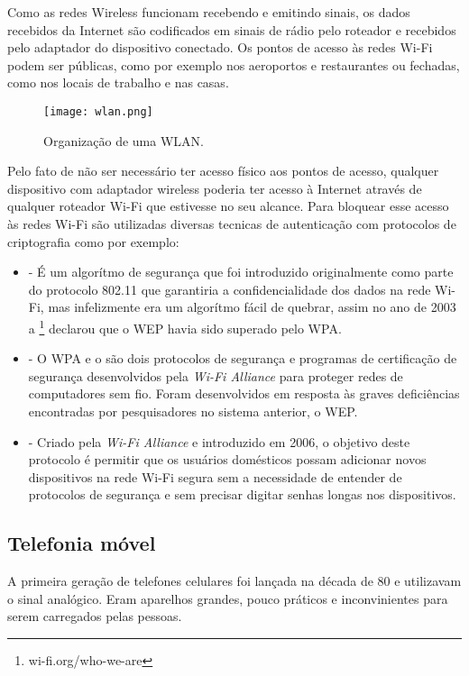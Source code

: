 Como as redes Wireless funcionam recebendo e emitindo sinais, os dados recebidos da Internet são codificados em sinais de rádio pelo roteador e recebidos pelo adaptador do dispositivo conectado.
Os pontos de acesso às redes Wi-Fi podem ser públicas, como por exemplo nos aeroportos e restaurantes ou fechadas, como nos locais de trabalho e nas casas.

\begin{figure}[!htb]
	\centering
	\texttt{[image: wlan.png]} %
	\caption[Organização de uma WLAN]{Organização de uma WLAN.}
	\label{fig:wlan}
\end{figure}

Pelo fato de não ser necessário ter acesso físico aos pontos de acesso, qualquer dispositivo com adaptador wireless poderia ter acesso à Internet através de qualquer roteador Wi-Fi que estivesse no seu alcance. Para bloquear esse acesso às redes Wi-Fi são utilizadas diversas tecnicas de autenticação com protocolos de criptografia como por exemplo:
\begin{itemize}
  \item {}
  - É um algorítmo de segurança que foi introduzido originalmente como parte do protocolo 802.11 que garantiria a confidencialidade dos dados na rede Wi-Fi, mas infelizmente era um algorítmo fácil de quebrar, assim no ano de 2003 a  \footnote{wi-fi.org/who-we-are} declarou que o WEP havia sido superado pelo WPA.
  \item {}
  - O WPA e o  são dois protocolos de segurança e programas de certificação de segurança desenvolvidos pela \textit{Wi-Fi Alliance} para proteger redes de computadores sem fio. Foram desenvolvidos em resposta às graves deficiências encontradas por pesquisadores no sistema anterior, o WEP.
  \item {}
  - Criado pela \textit{Wi-Fi Alliance} e introduzido em 2006, o objetivo deste protocolo é permitir que os usuários domésticos
  possam adicionar novos dispositivos na rede Wi-Fi segura sem a necessidade de entender de protocolos de segurança e sem precisar digitar senhas longas nos dispositivos.
\end{itemize}

\subsection{Telefonia móvel}
A primeira geração de telefones celulares foi lançada na década de 80 e utilizavam o sinal analógico. Eram aparelhos grandes, pouco práticos e inconvinientes para serem carregados pelas pessoas.

